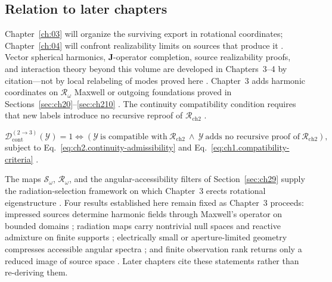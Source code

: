 \subsection{Relation to later chapters}
\label{sec:ch02113}
Chapter~\ref{ch:03} will organize the surviving export in rotational coordinates; Chapter~\ref{ch:04}
will confront realizability limits on sources that produce it \cite{harrington2001}. Vector spherical harmonics,
$\mathbf{J}$-operator completion, source realizability proofs, and interaction theory beyond
this volume are developed in Chapters~3--4 by citation---not by local relabeling of modes proved here
\cite{stratton1941}. Chapter~3 adds harmonic coordinates on $\mathcal{R}_\omega$ Maxwell or outgoing foundations proved in Sections~\ref{sec:ch20}--\ref{sec:ch210} \cite{stratton1941}. The continuity compatibility condition requires that new labels introduce no recursive reproof of $\mathcal{R}_{\mathrm{ch2}}$ \cite{stratton1941}.
\medskip

\begin{equation}
\label{eq:ch2.continuity-map}
\mathcal{D}_{\mathrm{cont}}^{(2\to 3)}(\mathcal{Y})=1
\iff
\left(
\mathcal{Y}\ \text{is compatible with}\ \mathcal{R}_{\mathrm{ch2}}
\ \wedge\
\mathcal{Y}\ \text{adds no recursive proof of}\ \mathcal{R}_{\mathrm{ch2}}
\right),
\end{equation}
subject to Eq.~\eqref{eq:ch2.continuity-admissibility} and
Eq.~\eqref{eq:ch1.compatibility-criteria} \cite{stratton1941}.

The maps $\mathcal{S}_\omega$, $\mathcal{R}_\omega$, and the angular-accessibility filters of
Section~\ref{sec:ch29} supply the radiation-selection framework on which Chapter~3 erects
rotational eigenstructure \cite{harrington2001}. Four results established here remain fixed as
Chapter~3 proceeds: impressed sources determine harmonic fields through Maxwell's operator on
bounded domains \cite{maxwell1873}; radiation maps carry nontrivial null spaces and reactive
admixture on finite supports \cite{devaney2004}; electrically small or aperture-limited geometry
compresses accessible angular spectra \cite{chu1948}; and finite observation rank returns only a
reduced image of source space \cite{hansen1988}. Later chapters cite these statements rather than
re-deriving them.